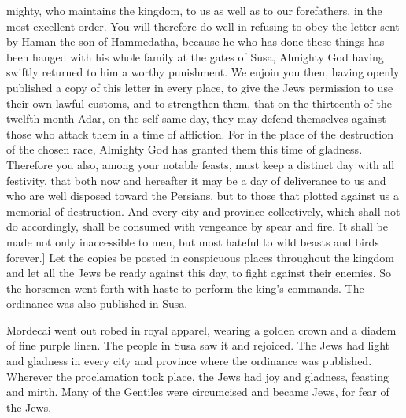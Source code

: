 {{} mighty, who maintains the kingdom, to us as well as to our forefathers, in the most excellent order. You will therefore do well in refusing to obey the letter sent by Haman the son of Hammedatha, because he who has done these things has been hanged with his whole family at the gates of Susa, Almighty God having swiftly returned to him a worthy punishment. We enjoin you then, having openly published a copy of this letter in every place, to give the Jews permission to use their own lawful customs, and to strengthen them, that on the thirteenth of the twelfth month Adar, on the self-same day, they may defend themselves against those who attack them in a time of affliction. For in the place of the destruction of the chosen race, Almighty God has granted them this time of gladness. Therefore you also, among your notable feasts, must keep a distinct day with all festivity, that both now and hereafter it may be a day of deliverance to us and who are well disposed toward the Persians, but to those that plotted against us a memorial of destruction. And every city and province collectively, which shall not do accordingly, shall be consumed with vengeance by spear and fire. It shall be made not only inaccessible to men, but most hateful to wild beasts and birds forever.] Let the copies be posted in conspicuous places throughout the kingdom and let all the Jews be ready against this day, to fight against their enemies.
So the horsemen went forth with haste to perform the king’s commands. The ordinance was also published in Susa.
\par }{\PP {}Mordecai went out robed in royal apparel, wearing a golden crown and a diadem of fine purple linen. The people in Susa saw it and rejoiced.
The Jews had light and gladness
in every city and province where the ordinance was published. Wherever the proclamation took place, the Jews had joy and gladness, feasting and mirth. Many of the Gentiles were circumcised and became Jews, for fear of the Jews.

}
